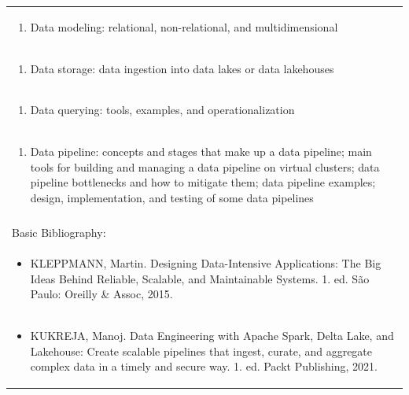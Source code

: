 \documentclass[11pt]{article}
\begin{document}
\begin{center}
\begin{longtable}{|p{4cm}|p{4cm}|p{4cm}|p{4cm}|}
\multicolumn{4}{|p{\dimexpr 16cm + 6\tabcolsep\relax}|}{\begin{enumerate}[start=8]\item Data modeling: relational, non-relational, and multidimensional\end{enumerate}}\\
\multicolumn{4}{|p{\dimexpr 16cm + 6\tabcolsep\relax}|}{\begin{enumerate}[start=9]\item Data storage: data ingestion into data lakes or data lakehouses\end{enumerate}}\\
\multicolumn{4}{|p{\dimexpr 16cm + 6\tabcolsep\relax}|}{\begin{enumerate}[start=10]\item Data querying: tools, examples, and operationalization\end{enumerate}}\\
\multicolumn{4}{|p{\dimexpr 16cm + 6\tabcolsep\relax}|}{\begin{enumerate}[start=11]\item Data pipeline: concepts and stages that make up a data pipeline; main tools for building and managing a data pipeline on virtual clusters; data pipeline bottlenecks and how to mitigate them; data pipeline examples; design, implementation, and testing of some data pipelines\end{enumerate}}\\
\multicolumn{4}{|p{\dimexpr 16cm + 6\tabcolsep\relax}|}{}\\
\hline
\multicolumn{4}{|p{16cm}|}{Basic Bibliography:}\\*
\multicolumn{4}{|p{\dimexpr 16cm + 6\tabcolsep\relax}|}{\begin{itemize}\item KLEPPMANN, Martin. Designing Data-Intensive Applications: The Big Ideas Behind Reliable, Scalable, and Maintainable Systems. 1. ed. São Paulo: Oreilly \& Assoc, 2015.\end{itemize}}\\
\multicolumn{4}{|p{\dimexpr 16cm + 6\tabcolsep\relax}|}{\begin{itemize}\item KUKREJA, Manoj. Data Engineering with Apache Spark, Delta Lake, and Lakehouse: Create scalable pipelines that ingest, curate, and aggregate complex data in a timely and secure way. 1. ed. Packt Publishing, 2021.\end{itemize}}\\

\end{longtable}
\end{center}
\end{document}
